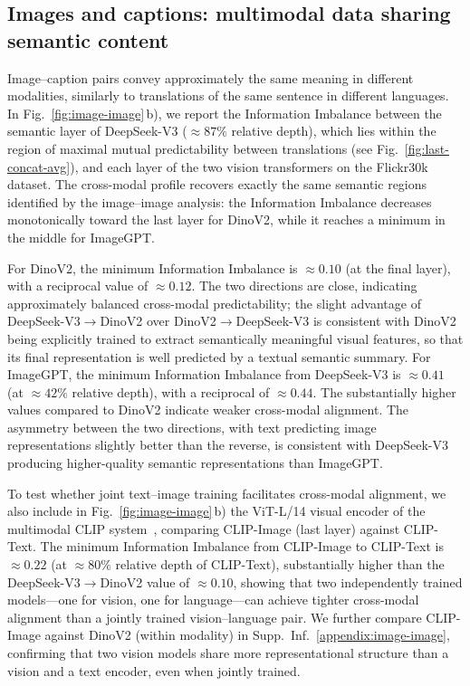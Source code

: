 \subsection{Images and captions: multimodal data sharing semantic content}

Image--caption pairs convey approximately the same meaning in different modalities, similarly to translations of the same sentence in different languages.
In Fig.~\ref{fig:image-image}\,b), we report the Information Imbalance between the semantic layer of DeepSeek-V3 ($\approx 87\%$ relative depth), which lies within the region of maximal mutual predictability between translations (see Fig.~\ref{fig:last-concat-avg}), and each layer of the two vision transformers on the Flickr30k dataset.
The cross-modal profile recovers exactly the same semantic regions identified by the image--image analysis: the Information Imbalance decreases monotonically toward the last layer for DinoV2, while it reaches a minimum in the middle for ImageGPT.

For DinoV2, the minimum Information Imbalance is $\approx 0.10$ (at the final layer), with a reciprocal value of $\approx 0.12$.
The two directions are close, indicating approximately balanced cross-modal predictability; the slight advantage of DeepSeek-V3$\to$DinoV2 over DinoV2$\to$DeepSeek-V3 is consistent with DinoV2 being explicitly trained to extract semantically meaningful visual features, so that its final representation is well predicted by a textual semantic summary.
For ImageGPT, the minimum Information Imbalance from DeepSeek-V3 is $\approx 0.41$ (at $\approx 42\%$ relative depth), with a reciprocal of $\approx 0.44$.
The substantially higher values compared to DinoV2 indicate weaker cross-modal alignment.
The asymmetry between the two directions, with text predicting image representations slightly better than the reverse, is consistent with DeepSeek-V3 producing higher-quality semantic representations than ImageGPT.

To test whether joint text--image training facilitates cross-modal alignment, we also include in Fig.~\ref{fig:image-image}\,b) the ViT-L/14 visual encoder of the multimodal CLIP system~\citep{radford2021learning}, comparing CLIP-Image (last layer) against CLIP-Text.
The minimum Information Imbalance from CLIP-Image to CLIP-Text is $\approx 0.22$ (at $\approx 80\%$ relative depth of CLIP-Text), substantially higher than the DeepSeek-V3$\to$DinoV2 value of $\approx 0.10$, showing that two independently trained models---one for vision, one for language---can achieve tighter cross-modal alignment than a jointly trained vision--language pair.
We further compare CLIP-Image against DinoV2 (within modality) in Supp.~Inf.~\ref{appendix:image-image}, confirming that two vision models share more representational structure than a vision and a text encoder, even when jointly trained.

